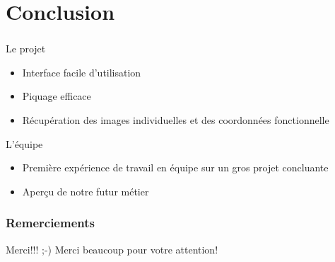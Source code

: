 \documentclass[11pt]{beamer}
\begin{document}
\section{Conclusion}
\begin{frame}
\frametitle{\secname}
	\begin{block}{Le projet}
		\begin{itemize}
			\item Interface facile d'utilisation
			\item Piquage efficace
			\item Récupération des images individuelles et des coordonnées fonctionnelle
		\end{itemize}
	\end{block}
	\begin{block}{L'équipe}
		\begin{itemize}
			\item Première expérience de travail en équipe sur un gros projet concluante
			\item Aperçu de notre futur métier
		\end{itemize}
	\end{block}
\end{frame}
\begin{frame}
	\frametitle{Remerciements}
	\begin{block}{Merci!!! ;-)}
		Merci beaucoup pour votre attention! %
	\end{block}
\end{frame}
\end{document}
